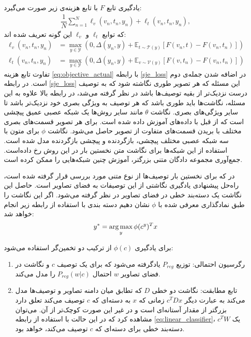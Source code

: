 یادگیری تابع $F$ با تابع هزینه‌ی زیر صورت می‌گیرد:
\begin{align}
\label{eq:objective_actual}
\dfrac{1}{N}\sum_{n=1}^{N} \ell_v(v_n, t_n, y_n) + \ell_t(v_n, t_n, y_n),
\end{align}
که توابع $ \ell_t$ و $\ell_v$ این گونه تعریف شده اند:
\begin{align*}
\ell_v(v_n, t_n, y_n) &=  \underset{y \in \mathcal{Y}}{\max}(0,\Delta(y_n, y) + \mathbb{E}_{t \sim \mathcal{T}(y)} [ F(v_n,t) - F(v_n,t_n) ]) \\
\ell_t(v_n, t_n, y_n) &= \underset{y \in \mathcal{Y}}{\max}(0,\Delta(y_n, y) + \mathbb{E}_{v \sim \mathcal{V}(y)} [ F(v,t_n) - F(v_n,t_n)])
\end{align*}
تفاوت تابع هزینه \eqref{eq:objective_actual} با رابطه \eqref{sje_loss} در اضافه شدن جمله‌ی دوم است. در  رابطه \eqref{sje_loss} این مسئله که هر تصویر طوری نگاشته شود که به توصیف درست نزدیک‌تر از بقیه توصیف‌ها باشد در نظر گرفته می‌شد، در رابطه بالا علاوه به این مسئله، نگاشت‌ها باید طوری باشد که هر توصیف به ويژگی بصری خود نزدیک‌تر باشد تا سایر ویژگی‌های بصری.
نگاشت $\theta$ مانند سایر روش‌ها یک شبکه عصبی عمیق پیچشی است که از قبل با داده‌های  آموزش داده شده است. برای هر تصویر قسمت‌های بصری مختلف با بریدن قسمت‌های متفاوت از تصویر حاصل می‌شود. نگاشت $\phi$ برای متون با سه شبکه عصبی مختلف پیچشی، بازگردنده و پیچشی بازگردنده مدل شده است. استفاده از این شبکه‌ها برای نگاشت متن نخستین بار در این روش رخ داده‌است. جمع‌آوری مجموعه دادگان متنی بزرگتر، آموزش چنین شبکه‌هایی را ممکن کرده است.

در  \cite{mohamed13} که برای نخستین بار توصیف‌ها از نوع متنی مورد بررسی قرار گرفته شده است، راه‌حل پیشنهادی یادگیری نگاشتی از این توصیفات به فضای تصاویر است. حاصل این نگاشت یک دسته‌بند خطی در فضای تصاویر در نظر گرفته می‌شود. اگر این نگاشت را طبق نمادگذاری معرفی شده با $\phi$ نشان دهیم دسته بندی با استفاده از رابطه زیر انجام خواهد شد:
\begin{equation} \label{eq:linear_classifier}
y^* = \operatorname*{arg\,max}_y \phi(c^y)^T x
\end{equation}


برای یادگیری $\phi(c)$ از ترکیب دو تخمین‌گر استفاده می‌شود:
\begin{enumerate}
\item
رگرسیون احتمالی: توزیع $P_{reg}$ یادگرفته می‌شود که برای یک توصیف $c$ و نگاشت در فضای تصاویر $w$ احتمال $P_{reg}(w|c)$ را مدل می‌کند.
\item
تابع مطابقت: نگاشت دو خطی $D$ که تطابق میان دامنه تصاویر و توصیف‌ها مدل می‌کند به عبارت دیگر $c^TDx$ زمانی که $x$ به دسته‌ای که   $c$ توصیف می‌کند تعلق دارد بزرگتر از مقدار آستانه‌ای است و در غیر این صورت کوچک‌تر از آن. می‌توان مشاهده کرد که در این حالت با استفاده از رابطه
\eqref{eq:linear_classifier}،
 $c^TW$
یک  دسته‌بند خطی برای دسته‌ای که $c$ توصیف می‌کند، خواهد بود.
\end{enumerate}

